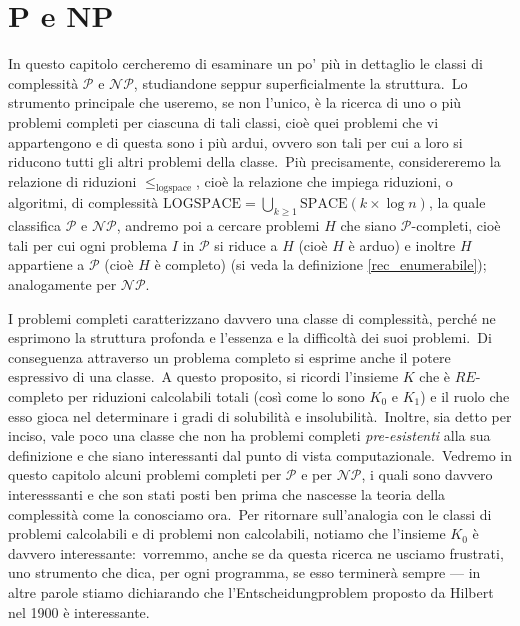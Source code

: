 \section{P e NP}

In questo capitolo cercheremo di esaminare un po' più in dettaglio le classi di complessità $\mathcal{P}$ e $\mathcal{NP}$, studiandone seppur superficialmente la struttura.\
Lo strumento principale che useremo, se non l'unico, è la ricerca di uno o più problemi completi per ciascuna di tali classi, cioè quei problemi che vi appartengono e di questa sono i più ardui, ovvero son tali per cui a loro si riducono tutti gli altri problemi della classe.\
Più precisamente, considereremo la relazione di riduzioni $\leqslant_{\mathrm{logspace}}$, cioè la relazione che impiega riduzioni, o algoritmi, di complessità $\mathrm{LOGSPACE} = \bigcup_{k\geq 1} \mathrm{SPACE}(k \times \log n)$, la quale classifica $\mathcal{P}$ e $\mathcal{NP}$, andremo poi a cercare problemi $H$ che siano $\mathcal{P}$-completi, cioè tali per cui ogni problema $I$ in $\mathcal{P}$ si riduce a $H$ (cioè $H$ è arduo) e inoltre $H$ appartiene a $\mathcal{P}$ (cioè $H$ è completo) (si veda la definizione \ref{rec_enumerabile}); analogamente per $\mathcal{NP}$.

I problemi completi caratterizzano davvero una classe di complessità, perché ne esprimono la struttura profonda e l'essenza e la difficoltà dei suoi problemi.\
Di conseguenza attraverso un problema completo si esprime anche il potere espressivo di una classe.\
A questo proposito, si ricordi l'insieme $K$ che è $RE$-completo per riduzioni calcolabili totali (così come lo sono $K_0$ e $K_1$) e il ruolo che esso gioca nel determinare i gradi di solubilità e insolubilità.\
Inoltre, sia detto per inciso, vale poco una classe che non ha problemi completi \textit{pre-esistenti} alla sua definizione e che siano interessanti dal punto di vista computazionale.\
Vedremo in questo capitolo alcuni problemi completi per $\mathcal{P}$ e per $\mathcal{NP}$, i quali sono davvero interesssanti e che son stati posti ben prima che nascesse la teoria della complessità come la conosciamo ora.\
Per ritornare sull'analogia con le classi di problemi calcolabili e di problemi non calcolabili, notiamo che l'insieme $K_0$ è davvero interessante:\ vorremmo, anche se da questa ricerca ne usciamo frustrati, uno strumento che dica, per ogni programma, se esso terminerà sempre --- in altre parole stiamo dichiarando che l'Entscheidungproblem proposto da Hilbert nel 1900 è interessante.\

